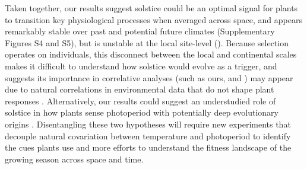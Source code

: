 \documentclass[11pt,letter]{article}
\begin{document}
Taken together, our results suggest solstice could be an optimal signal for plants to transition key physiological processes when averaged across space, and appears remarkably stable over past and potential future climates  (Supplementary Figures S4 and S5), but is unstable at the local site-level (). Because selection operates on individuals, this disconnect between the local and continental scales makes it difficult to understand how solstice would evolve as a trigger, and suggests its importance in correlative analyses (such as ours, \citet{Zohner2023} and \citet{Journe2024}) may appear due to natural correlations in environmental data that do not shape plant responses \citep[e.g.][]{Gao2024}. Alternatively, our results could suggest an understudied role of solstice in how plants sense photoperiod with potentially deep evolutionary origins \citep{morales2024phylogenetic}. Disentangling these two hypotheses will require new experiments that decouple natural covariation between temperature and photoperiod \citep{Buonaiuto2023, Elmendorf2020} to identify the cues plants use and more efforts to understand the fitness landscape of the growing season across space and time. %
\end{document}
